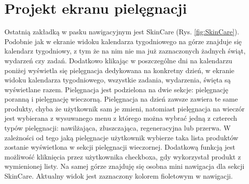 \section*{Projekt ekranu pielęgnacji}
Ostatnią zakładką w pasku nawigacyjnym jest SkinCare (Rys. \ref{fig:SkinCare}). Podobnie jak w ekranie widoku kalendarza tygodniowego na górze znajduje się kalendarz tygodniowy, z tym że na nim nie ma już zaznaczonych żadnych świąt, wydarzeń czy zadań. Dodatkowo klikając w poszczególne dni na kalendarzu poniżej wyświetla się pielęgnacja dedykowana na konkretny dzień, w ekranie widoku kalendarza tygodniowego, wszystkie zadania, wydarzenia, święta są wyświetlane razem. Pielęgnacja jest podzielona na dwie sekcje: pielęgnację poranną i pielęgnację wieczorną. Pielęgnacja na dzień zawsze zawiera te same produkty, chyba że użytkownik sam je zmieni, natomiast pielęgnacja na wieczór jest wybierana z wysuwanego menu z którego można wybrać jedną z czterech typów pielęgnacji: nawilżająca, złuszczająca, regeneracyjna lub przerwa. W zależności od tego jaką pielęgnacje użytkownik wybierze taka lista produktów zostanie wyświetlona w sekcji pielęgnacji wieczornej. Dodatkową funkcją jest możliwość kliknięcia przez użytkownika checkboxa, gdy wykorzystał produkt z wymienionej listy. Na samej górze znajduję się osobna mini nawigacja dla sekcji SkinCare. Aktualny widok jest zaznaczony kolorem fioletowym w nawigacji.

